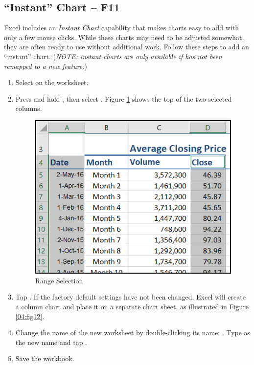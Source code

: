 \subsection{``Instant'' Chart – F11}

Excel includes an \textit{Instant Chart} capability that makes charts easy to add with only a few mouse clicks. While these charts may need to be adjusted somewhat, they are often ready to use without additional work. Follow these steps to add an ``instant'' chart. (\textit{NOTE: instant charts are only available if  has not been remapped to a new feature.})

\begin{enumbox}
	\begin{enumerate}
		\item Select  on the  worksheet.
		\item Press and hold , then select . Figure \ref{04:fig11} shows the top of the two selected columns.
	
		\begin{figure}[H]
			\centering
			\includegraphics[width=\maxwidth{.65\linewidth}]{gfx/ch04_fig11}
			\caption{Range Selection}
			\label{04:fig11}
		\end{figure}
	
		\item Tap . If the factory default settings have not been changed, Excel will create a column chart and place it on a separate chart sheet, as illustrated in Figure \ref{04:fig12}.
		\item Change the name of the new worksheet by double-clicking its name: . Type  as the new name and tap .
		\item Save the  workbook.
	\end{enumerate}
\end{enumbox}
	
